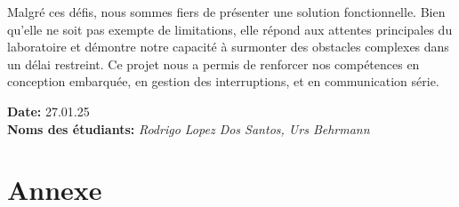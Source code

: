 \documentclass[a4paper,12pt]{article}
\begin{document}
Malgré ces défis, nous sommes fiers de présenter une solution fonctionnelle. Bien qu'elle ne soit pas exempte de limitations, elle répond aux attentes principales du laboratoire et démontre notre capacité à surmonter des obstacles complexes dans un délai restreint. Ce projet nous a permis de renforcer nos compétences en conception embarquée, en gestion des interruptions, et en communication série.

\vspace{2cm}
\noindent
\textbf{Date:} 27.01.25 \\
\textbf{Noms des étudiants:} \textit{Rodrigo Lopez Dos Santos, Urs Behrmann}

\break

\section{Annexe}
\end{document}
